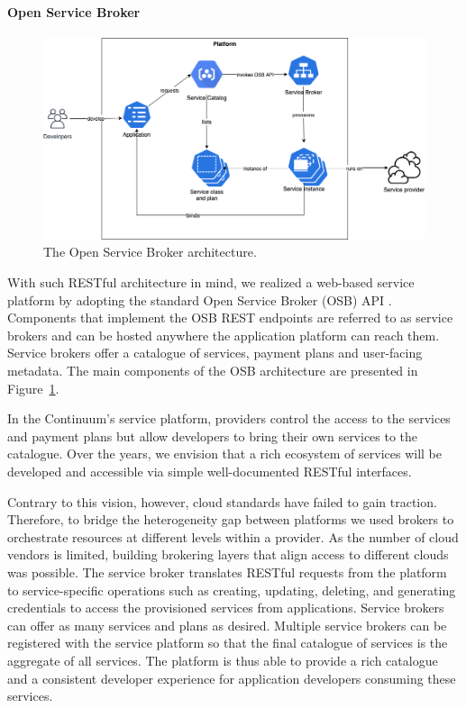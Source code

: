 \paragraph{Open Service Broker}

\begin{figure}[ht]
\centering
\includegraphics[width=\columnwidth]{figures/osb}
\caption{The Open Service Broker architecture.} \label{fig:osb}
\end{figure}

With such RESTful architecture in mind, we realized a web-based service platform by adopting the standard Open Service Broker (OSB) API \cite{osb}. Components that implement the OSB REST endpoints are referred to as service brokers and can be hosted anywhere the application platform can reach them. Service brokers offer a catalogue of services, payment plans and user-facing metadata. The main components of the OSB architecture are presented in Figure~\ref{fig:osb}.

In the Continuum's service platform, providers control the access to the services and payment plans but allow developers to bring their own services to the catalogue. Over the years, we envision that a rich ecosystem of services will be developed and accessible via simple well-documented RESTful interfaces.

Contrary to this vision, however, cloud standards have failed to gain traction. Therefore, to bridge the heterogeneity gap between platforms we used brokers to orchestrate resources at different levels within a provider. As the number of cloud vendors is limited, building brokering layers that align access to different clouds was possible. The service broker translates RESTful requests from the platform to service-specific operations such as creating, updating, deleting, and generating credentials to access the provisioned services from applications. Service brokers can offer as many services and plans as desired. Multiple service brokers can be registered with the service platform so that the final catalogue of services is the aggregate of all services. The platform is thus able to provide a rich catalogue and a consistent developer experience for application developers consuming these services.


